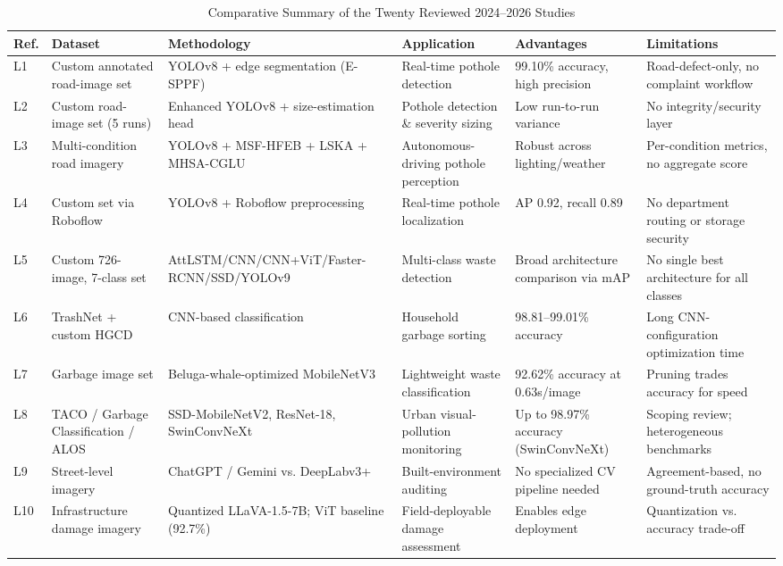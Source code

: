 \documentclass[conference]{IEEEtran}
\begin{document}
\begin{table}[t]
\caption{Comparative Summary of the Twenty Reviewed 2024--2026 Studies}
\label{tab:lit20}
\centering
\footnotesize
\begin{tabular}{p{}p{}p{}p{}p{}p{}}
\toprule
\textbf{Ref.} & \textbf{Dataset} & \textbf{Methodology} & \textbf{Application} & \textbf{Advantages} & \textbf{Limitations} \\
\midrule
L1 & Custom annotated road-image set & YOLOv8 + edge segmentation (E-SPPF) & Real-time pothole detection & 99.10\% accuracy, high precision & Road-defect-only, no complaint workflow \\
L2 & Custom road-image set (5 runs) & Enhanced YOLOv8 + size-estimation head & Pothole detection \& severity sizing & Low run-to-run variance & No integrity/security layer \\
L3 & Multi-condition road imagery & YOLOv8 + MSF-HFEB + LSKA + MHSA-CGLU & Autonomous-driving pothole perception & Robust across lighting/weather & Per-condition metrics, no aggregate score \\
L4 & Custom set via Roboflow & YOLOv8 + Roboflow preprocessing & Real-time pothole localization & AP 0.92, recall 0.89 & No department routing or storage security \\
L5 & Custom 726-image, 7-class set & AttLSTM/CNN/CNN+ViT/Faster-RCNN/SSD/YOLOv9 & Multi-class waste detection & Broad architecture comparison via mAP & No single best architecture for all classes \\
L6 & TrashNet + custom HGCD & CNN-based classification & Household garbage sorting & 98.81--99.01\% accuracy & Long CNN-configuration optimization time \\
L7 & Garbage image set & Beluga-whale-optimized MobileNetV3 & Lightweight waste classification & 92.62\% accuracy at 0.63s/image & Pruning trades accuracy for speed \\
L8 & TACO / Garbage Classification / ALOS & SSD-MobileNetV2, ResNet-18, SwinConvNeXt & Urban visual-pollution monitoring & Up to 98.97\% accuracy (SwinConvNeXt) & Scoping review; heterogeneous benchmarks \\
L9 & Street-level imagery & ChatGPT / Gemini vs. DeepLabv3+ & Built-environment auditing & No specialized CV pipeline needed & Agreement-based, no ground-truth accuracy \\
L10 & Infrastructure damage imagery & Quantized LLaVA-1.5-7B; ViT baseline (92.7\%) & Field-deployable damage assessment & Enables edge deployment & Quantization vs. accuracy trade-off \\

\end{tabular}
\end{table}
\end{document}
